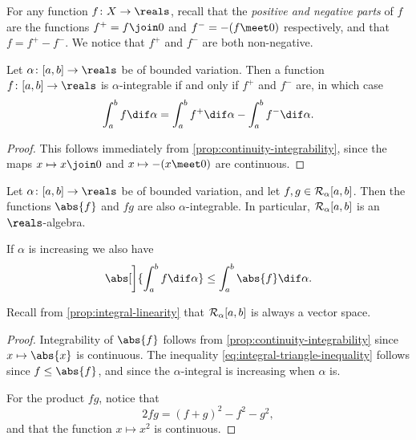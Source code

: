\documentclass[article, a4paper, 11pt, oneside]{memoir}
\numberwithin{equation}{chapter}
\begin{document}
For any function $f \colon X \to \reals$, recall that the \emph{positive and negative parts} of $f$ are the functions $f^+ = f \join 0$ and $f^- = -(f \meet 0)$ respectively, and that $f = f^+ - f^-$. We notice that $f^+$ and $f^-$ are both non-negative.

\begin{corollary}
    \label{cor:positive-negative-part}
    Let $\alpha \colon [a,b] \to \reals$ be of bounded variation. Then a function $f \colon [a,b] \to \reals$ is $\alpha$-integrable if and only if $f^+$ and $f^-$ are, in which case
    \begin{equation*}
        \int_a^b f \dif\alpha
            = \int_a^b f^+ \dif\alpha - \int_a^b f^- \dif\alpha.
    \end{equation*}
\end{corollary}

\begin{proof}
    This follows immediately from \cref{prop:continuity-integrability}, since the maps $x \mapsto x \join 0$ and $x \mapsto -(x \meet 0)$ are continuous.
\end{proof}


\begin{corollary}
    \label{cor:product-abs-integrable}
    Let $\alpha \colon [a,b] \to \reals$ be of bounded variation, and let $f,g \in \integrable[\alpha]{a,b}$. Then the functions $\abs{f}$ and $fg$ are also $\alpha$-integrable. In particular, $\integrable[\alpha]{a,b}$ is an $\reals$-algebra.
    
    If $\alpha$ is increasing we also have
    \begin{equation}
        \label{eq:integral-triangle-inequality}
        \abs[\bigg]{ \int_a^b f \dif\alpha }
            \leq \int_a^b \abs{f}\dif\alpha.
    \end{equation}
\end{corollary}
%
Recall from \cref{prop:integral-linearity} that $\integrable[\alpha]{a,b}$ is always a vector space. 

\begin{proof}
    Integrability of $\abs{f}$ follows from \cref{prop:continuity-integrability} since $x \mapsto \abs{x}$ is continuous. The inequality \cref{eq:integral-triangle-inequality} follows since $f \leq \abs{f}$, and since the $\alpha$-integral is increasing when $\alpha$ is.

    For the product $fg$, notice that
    \begin{equation*}
        2fg = (f+g)^2 - f^2 - g^2,
    \end{equation*}
    and that the function $x \mapsto x^2$ is continuous.
\end{proof}
\end{document}
